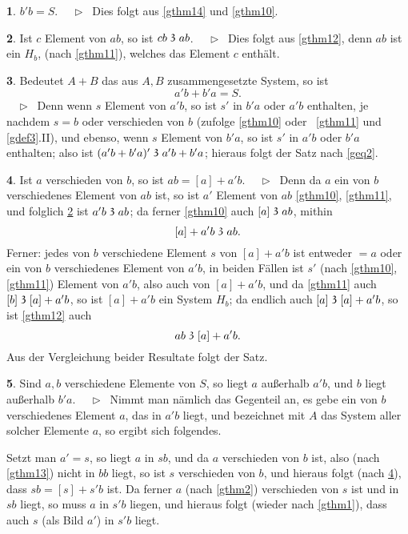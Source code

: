 \documentclass[leqno,hidelinks]{article}
\theoremstyle{definition}
\newtheorem{satz}{\protect\satzname}
\newcommand{\satzname}{}
\renewcommand{\satzname}{\hspace{-4pt}.\ Satz}%
\renewcommand{\satzname}{\hspace{-4pt}.\ Theorem}%
\newcommand\Beweis{\medskip \newline $ \phantom{'.'} \rhd \ $}%
\newcommand\beweis{ $ \phantom{'.'} \rhd \ $}%
\newcommand\TeilVon{\mathrel{\raisebox{0.45ex}{$\mathfrak{3}$}}}
\newcommand{\sref}[1]{\underline{\ref{#1}}}%
\begin{document}
\begin{paracol}{2}
\begin{satz}\label{gthm15}
$b' b = S$.
\Beweis
Dies folgt aus \sref{gthm14} und \sref{gthm10}.
\end{satz}

\begin{satz}\label{gthm16}
Ist $c$ Element von $ab$, so ist $cb \TeilVon ab$.
\Beweis
Dies folgt aus \sref{gthm12}, denn $ab$ ist ein $H_b$,
(nach \sref{gthm11}), welches das Element $c$ enthält.
\end{satz}

\begin{satz}\label{gthm17}
Bedeutet $A + B$ das aus $A, B$ zusammengesetzte System, so ist
\[
	a'b + b'a = S.
\]%
\beweis
Denn wenn $s$ Element von $a'b$, so ist $s'$ in $b'a$ oder $a'b$
enthalten, je nachdem $s = b$ oder verschieden von $b$ (zufolge \sref{gthm10}
oder ~\sref{gthm11} und \sref{gdef3}.II), und ebenso, wenn $s$ Element von
$b'a$, so ist $s'$ in $a'b$ oder $b'a$ enthalten; also ist
$(a'b + b'a)' \TeilVon a'b + b'a$; hieraus folgt der Satz nach \eqref{geq2}.
\end{satz}

\begin{satz}\label{gthm18}
Ist $a$ verschieden von $b$, so ist $ab = [a] + a'b$.
\Beweis
Denn da $a$ ein von $b$ verschiedenes Element von $ab$ ist, so ist $a'$ Element
von $ab$ \sref{gthm10}, \sref{gthm11}, und folglich \sref{gthm16} ist
$a'b \TeilVon ab$; da ferner \sref{gthm10} auch $[a] \TeilVon ab$, mithin
\[
	[a] + a'b \TeilVon ab.
\]
Ferner: jedes von $b$ verschiedene Element $s$ von $[a] + a'b$ ist entweder
$= a$ oder ein von $b$ verschiedenes Element von $a'b$, in beiden Fällen ist
$s'$ (nach \sref{gthm10}, \sref{gthm11}) Element von $a'b$, also auch von
$[a]+ a'b$, und da \sref{gthm11} auch $[b] \TeilVon [a] + a'b$, so ist
$[a] + a'b$ ein System $H_b$; da endlich auch $[a] \TeilVon [a] + a'b$, so ist
\sref{gthm12} auch
\[
	ab \TeilVon [a] + a' b.
\]
Aus der Vergleichung beider Resultate folgt der Satz.
\end{satz}

\newpage

\begin{satz}\label{gthm19}
Sind $a, b$ verschiedene Elemente von $S$, so liegt $a$ außerhalb $a'b$,
und $b$ liegt außerhalb $b'a$.
\Beweis
Nimmt man nämlich das Gegenteil an, es gebe ein von $b$ verschiedenes
Element $a$, das in $a'b$ liegt, und bezeichnet mit $A$ das System aller
solcher Elemente $a$, so ergibt sich folgendes.

Setzt man $a' = s$, so liegt $a$ in $sb$, und da $a$ verschieden von $b$ ist, also
(nach \sref{gthm13}) nicht in $bb$ liegt, so ist $s$ verschieden von $b$, und
hieraus folgt (nach \sref{gthm18}), dass $sb = [s] + s'b$ ist. Da ferner $a$
(nach \sref{gthm2}) verschieden von $s$ ist und in $sb$ liegt, so muss $a$ in
$s'b$ liegen, und hieraus folgt (wieder nach \sref{gthm1}), dass auch $s$
(als Bild $a'$) in $s'b$ liegt.


\end{satz}
\end{paracol}
\end{document}
